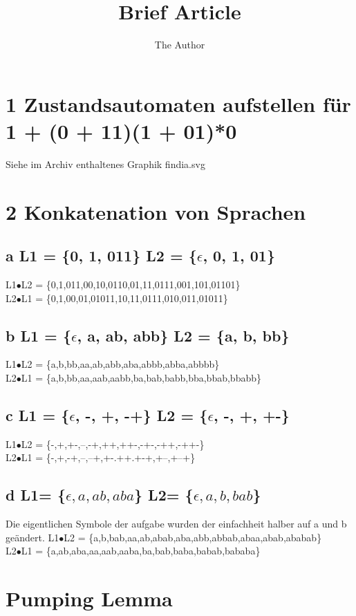\documentclass[11pt]{article} %
\title{Brief Article}
\author{The Author}
\begin{document}
\maketitle

\section{1 Zustandsautomaten aufstellen für 1 + (0 + 11)(1 + 01)*0}
Siehe im Archiv enthaltenes Graphik findia.svg
\section{2 Konkatenation von Sprachen}
\subsection{a  L1 = \{0, 1, 011\} L2 = \{$\epsilon$, 0, 1, 01\}}
L1$\bullet$L2 = \{0,1,011,00,10,0110,01,11,0111,001,101,01101\}\\
L2$\bullet$L1 = \{0,1,00,01,01011,10,11,0111,010,011,01011\}\\
\subsection{b L1 = \{$\epsilon$, a, ab, abb\} L2 = \{a, b, bb\}}
L1$\bullet$L2 = \{a,b,bb,aa,ab,abb,aba,abbb,abba,abbbb\}\\
L2$\bullet$L1 = \{a,b,bb,aa,aab,aabb,ba,bab,babb,bba,bbab,bbabb\}\\
\subsection{c L1 = \{$\epsilon$, -, +, -+\} L2 = \{$\epsilon$, -, +, +-\}}
L1$\bullet$L2 = \{-,+,+-,--,-+,++,++-,-+-,-++,-++-\}\\
L2$\bullet$L1 = \{-,+,-+,--,--+,+-.++.+-+,+--,+--+\}\\
\subsection{d L1= \{$\epsilon, a, ab,aba$\}  L2= \{$\epsilon,a,b,bab$\}}
Die eigentlichen Symbole der aufgabe wurden der einfachheit halber auf a und b geändert.
L1$\bullet$L2 = \{a,b,bab,aa,ab,abab,aba,abb,abbab,abaa,abab,ababab\}\\
L2$\bullet$L1 = \{a,ab,aba,aa,aab,aaba,ba,bab,baba,babab,bababa\}\\
 \section{Pumping Lemma}
\end{document}

